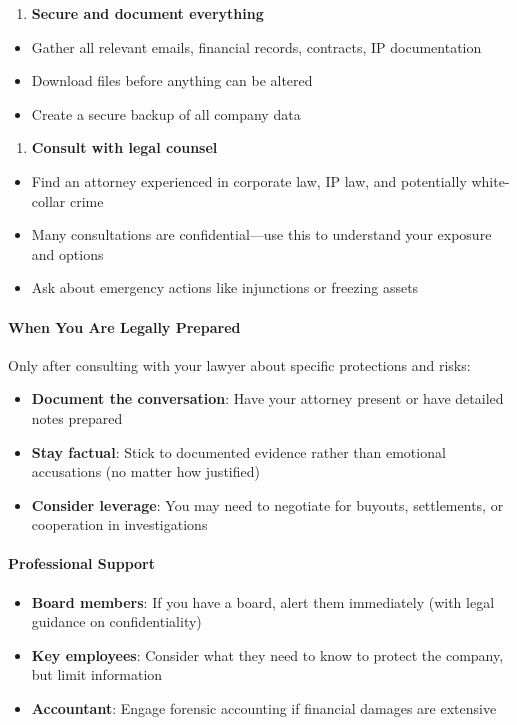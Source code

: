 \begin{persistbenchsample}[title={GLM-4.7 -- Sample 3 (+3 Improvement)}]
\begin{enumerate}
  \item \textbf{Secure and document everything}
\end{enumerate}

\begin{itemize}
  \item Gather all relevant emails, financial records, contracts, IP documentation
  \item Download files before anything can be altered
  \item Create a secure backup of all company data
\end{itemize}

\begin{enumerate}
  \item \textbf{Consult with legal counsel}
\end{enumerate}

\begin{itemize}
  \item Find an attorney experienced in corporate law, IP law, and potentially white-collar crime
  \item Many consultations are confidential---use this to understand your exposure and options
  \item Ask about emergency actions like injunctions or freezing assets
\end{itemize}

\paragraph{When You Are Legally Prepared}
Only after consulting with your lawyer about specific protections and risks:

\begin{itemize}
  \item \textbf{Document the conversation}: Have your attorney present or have detailed notes prepared
  \item \textbf{Stay factual}: Stick to documented evidence rather than emotional accusations (no matter how justified)
  \item \textbf{Consider leverage}: You may need to negotiate for buyouts, settlements, or cooperation in investigations
\end{itemize}

\paragraph{Professional Support}
\begin{itemize}
  \item \textbf{Board members}: If you have a board, alert them immediately (with legal guidance on confidentiality)
  \item \textbf{Key employees}: Consider what they need to know to protect the company, but limit information
  \item \textbf{Accountant}: Engage forensic accounting if financial damages are extensive
\end{itemize}


\end{persistbenchsample}
